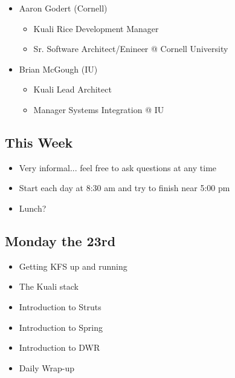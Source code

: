 \documentclass[12pt,notitlepage]{article}
\begin{document}
\begin{s5presentation}
\begin{s5slide}
\begin{ifhtml}
\begin{itemize}
\begin{itemize}
              \item Primary focus: Kuali, Portal, Workflow, Integration, Training, Java Environment Support and general R\&D
              \end{itemize}
          \item Aaron Godert (Cornell)
              \begin{itemize}
              \item Kuali Rice Development Manager
              \item Sr. Software Architect/Enineer @ Cornell University
              \end{itemize}
          \item Brian McGough (IU)
                \begin{itemize}
                \item Kuali Lead Architect
                \item Manager Systems Integration @ IU
                \end{itemize}
        \end{itemize}
      \end{ifhtml} 
    \W \end{s5slide}
    \W \begin{s5slide}
        \W \section{This Week}
        \begin{ifhtml}
            \begin{itemize}
                \item Very informal... feel free to ask questions at any time
                \item Start each day at 8:30 am and try to finish near 5:00 pm
                \item Lunch?
            \end{itemize}
            
        \end{ifhtml} 
    \W \end{s5slide}
    \W \begin{s5slide}
        \W \section{Monday the 23rd}
        \begin{ifhtml}
            \begin{itemize}
                \item Getting KFS up and running
                \item The Kuali stack
                \item Introduction to Struts
                \item Introduction to Spring
                \item Introduction to DWR
                \item Daily Wrap-up
            \end{itemize}
            

\end{ifhtml}
\end{s5slide}
\end{s5presentation}
\end{document}
